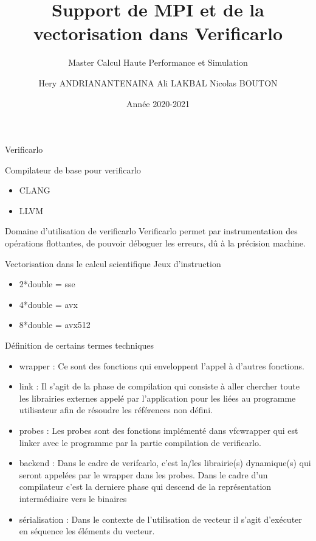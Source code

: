 \documentclass{beamer}
\title[Support pour Verificarlo]{Support de MPI et de la vectorisation dans Verificarlo}
\subtitle{Master Calcul Haute Performance et Simulation}
\author[Hery, Ali, Nicolas]{Hery ANDRIANANTENAINA \newline Ali LAKBAL \newline Nicolas BOUTON}
\institute[]{\textbf{Encadrant:} Eric PETIT}
\date{Année 2020-2021}
\begin{document}
\maketitle

\begin{frame}{Verificarlo}
    \begin{block}{Compilateur de base pour verificarlo}
      \begin{itemize}
          \item CLANG
          \item LLVM
      \end{itemize}
    \end{block}
  \begin{block}{Domaine d'utilisation de verificarlo}
    Verificarlo permet par instrumentation des opérations flottantes, de pouvoir déboguer les erreurs, dû à la précision machine.
  \end{block}
  \begin{block}{Vectorisation dans le calcul scientifique}
    Jeux d'instruction 
        \begin{itemize}
            \item 2*double = sse
            \item 4*double = avx
            \item 8*double = avx512
        \end{itemize}
  \end{block}
\end{frame}

\begin{frame}{Définition de certains termes techniques}
      \begin{itemize}
          \item wrapper : Ce sont des fonctions qui enveloppent l’appel à d’autres fonctions.
          \item link : Il s’agit de la phase de compilation qui consiste à aller chercher toute les librairies externes appelé par l’application pour les liées au programme utilisateur afin de résoudre les références non défini.
          \item probes : Les probes sont des fonctions implémenté dans vfcwrapper qui est linker avec le programme par la partie compilation de verificarlo.
          \item backend : Dans le cadre de verifcarlo, c’est la/les librairie(s) dynamique(s) qui seront appelées par le wrapper dans les probes. Dans le cadre d’un compilateur c’est la derniere phase qui descend de la représentation intermédiaire vers le binaires
          \item sérialisation : Dans le contexte de l’utilisation de vecteur il s’agit d’exécuter en séquence les éléments du vecteur.
      \end{itemize}
\end{frame}
\end{document}
